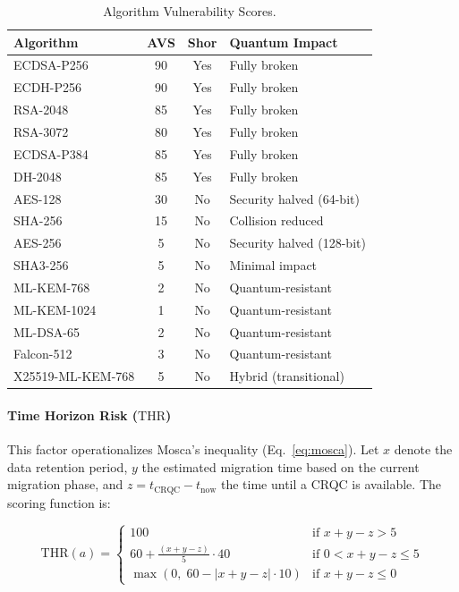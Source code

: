 \documentclass[conference,10pt]{IEEEtran}
\newcommand{\thr}{\textrm{THR}}
\begin{document}
\begin{table}[t]
\centering
\caption{Algorithm Vulnerability Scores.}
\label{tab:avs}
\footnotesize
\begin{tabular}{@{}lccl@{}}
\toprule
\textbf{Algorithm} & \textbf{AVS} & \textbf{Shor} & \textbf{Quantum Impact} \\
\midrule
ECDSA-P256       & 90  & Yes & Fully broken \\
ECDH-P256        & 90  & Yes & Fully broken \\
RSA-2048         & 85  & Yes & Fully broken \\
RSA-3072         & 80  & Yes & Fully broken \\
ECDSA-P384       & 85  & Yes & Fully broken \\
DH-2048          & 85  & Yes & Fully broken \\
\midrule
AES-128          & 30  & No  & Security halved (64-bit) \\
SHA-256          & 15  & No  & Collision reduced \\
AES-256          & 5   & No  & Security halved (128-bit) \\
SHA3-256         & 5   & No  & Minimal impact \\
\midrule
ML-KEM-768       & 2   & No  & Quantum-resistant \\
ML-KEM-1024      & 1   & No  & Quantum-resistant \\
ML-DSA-65        & 2   & No  & Quantum-resistant \\
Falcon-512       & 3   & No  & Quantum-resistant \\
X25519-ML-KEM-768 & 5  & No  & Hybrid (transitional) \\
\bottomrule
\end{tabular}
\end{table}

\paragraph{Time Horizon Risk ($\thr$)}
This factor operationalizes Mosca's inequality (Eq.~\ref{eq:mosca}). Let
$x$ denote the data retention period, $y$ the estimated migration time
based on the current migration phase, and $z = t_\text{CRQC} - t_\text{now}$
the time until a CRQC is available. The scoring function is:

\begin{equation}\label{eq:thr}
  \thr(a) =
  \begin{cases}
    100 & \text{if } x + y - z > 5 \\
    60 + \frac{(x + y - z)}{5} \cdot 40 & \text{if } 0 < x + y - z \leq 5 \\
    \max(0,\; 60 - |x + y - z| \cdot 10) & \text{if } x + y - z \leq 0
  \end{cases}
\end{equation}
\end{document}
